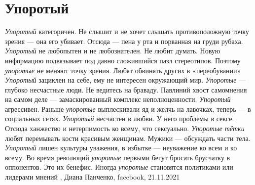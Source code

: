  
 
 
 
 
\chapter{Упоротый}
\label{sec:slova.uporotyj}

\emph{Упоротый} категоричен. Не слышит и не хочет слышать противоположную точку
зрения — она его убивает. Отсюда — пена у рта и порванная на груди рубаха.
\emph{Упоротый} не любопытен и не любознателен. Не любит думать. Новую
информацию подвязывает под давно сложившийся пазл стереотипов. Поэтому
\emph{упоротые} не меняют точку зрения. Любят обвинять других в «переобувании»
\emph{Упоротый} зациклен на себе, ему не интересен окружающий мир.
\emph{Упоротые} — глубоко несчастные люди. Не ведитесь на браваду. Павлиний
хвост самомнения на самом деле —  замаскированный комплекс неполноценности.
\emph{Упоротый} агрессивен. Раньше \emph{упоротые} выплескивали яд и желчь на
лавочках, теперь — в социальных сетях.  \emph{Упоротый} несчастен в любви. У
него проблемы в сексе. Отсюда ханжество и нетерпимость ко всему, что
сексуально. \emph{Упоротые тётки} любят перемывать кости красивым женщинам.
Мужики — обсуждать части тела.  \emph{Упоротый} лишен культуры уважения, в
избытке — неуважение ко всем и ко всему.  Во время революций \emph{упоротые}
первыми бегут бросать брусчатку в оппонентов. Это их бенефис.  Иногда
\emph{упоротые} становятся политиками или лидерами мнений
, Диана Панченко, facebook, 21.11.2021 
